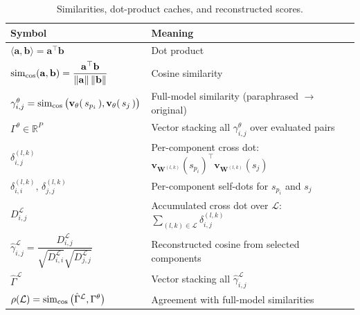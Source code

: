 \begin{table}[H]
    \centering
    \small
    \begin{tabular}{ll}
        \textbf{Symbol} & \textbf{Meaning} \\
        \hline
        $\langle \mathbf{a},\mathbf{b}\rangle=\mathbf{a}^{\top}\mathbf{b}$ & Dot product \\
        $\operatorname{sim}_{\cos}(\mathbf{a},\mathbf{b})=\dfrac{\mathbf{a}^{\top}\mathbf{b}}{\|\mathbf{a}\|\,\|\mathbf{b}\|}$ & Cosine similarity \\
        $\gamma_{i,j}^{\theta}=\operatorname{sim}_{\cos}\big(\mathbf{v}_{\theta}(\,s_{p_i}\,),\mathbf{v}_{\theta}(\,s_{j}\,)\big)$ & Full-model similarity (paraphrased $\to$ original) \\
        $\Gamma^\theta\in\mathbb{R}^{P}$ & Vector stacking all $\gamma_{i,j}^{\theta}$ over evaluated pairs \\
        $\delta^{(l,k)}_{i,j}$ & Per-component cross dot: $\mathbf{v}_{\mathbf{W}^{(l,k)}}(s_{p_i})^{\top}\mathbf{v}_{\mathbf{W}^{(l,k)}}(s_j)$ \\
        $\delta^{(l,k)}_{i,i},\,\delta^{(l,k)}_{j,j}$ & Per-component self-dots for $s_{p_i}$ and $s_j$ \\
        $D^{\mathcal{L}}_{i,j}$ & Accumulated cross dot over $\mathcal{L}$: $\sum_{(l,k)\in\mathcal{L}}\delta^{(l,k)}_{i,j}$ \\
        $\hat{\gamma}^{\mathcal{L}}_{i,j}=\dfrac{D^{\mathcal{L}}_{i,j}}{\sqrt{D^{\mathcal{L}}_{i,i}}\sqrt{D^{\mathcal{L}}_{j,j}}}$ & Reconstructed cosine from selected components \\
        $\hat{\Gamma}^{\mathcal{L}}$ & Vector stacking all $\hat{\gamma}^{\mathcal{L}}_{i,j}$ \\
        $\rho(\mathcal{L})=\operatorname{sim}_{\cos}\big(\hat{\Gamma}^{\mathcal{L}},\Gamma^\theta\big)$ & Agreement with full-model similarities \\
    \end{tabular}
    \caption{Similarities, dot-product caches, and reconstructed scores.}
    \label{tab:nomenclature-sims}
\end{table}

